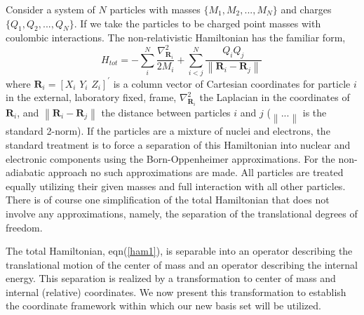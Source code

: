 \documentclass[12pt,doublespace]{article}
\begin{document}
Consider a system of $N$ particles with masses $\{M_{1},M_{2},...,M_{N}\}$
and charges $\{Q_{1},Q_{2},...,Q_{N}\}$. If we take the particles to be
charged point masses with coulombic interactions. The non-relativistic
Hamiltonian has the familiar form, 
\begin{equation}
H_{tot}=-\sum_{i}^{N}\frac{\nabla _{\mathbf{R}_{i}}^{2}}{2M_{i}}%
+\sum_{i<j}^{N}\frac{Q_{i}Q_{j}}{\left\| \mathbf{R}_{i}-\mathbf{R}%
_{j}\right\| }\,  \label{ham1}
\end{equation}
where $\mathbf{R}_{i}=[X_{i}\,\,Y_{i}\,\,Z_{i}]^{\prime }$ is a column
vector of Cartesian coordinates for particle $i$ in the external, laboratory
fixed, frame, $\nabla _{\mathbf{R}_{i}}^{2}$ the Laplacian in the
coordinates of $\mathbf{R}_{i}$, and $\left\| \mathbf{R}_{i}-\mathbf{R}%
_{j}\right\| $ the distance between particles $i$ and $j$ ($\left\|
...\right\| $ is the standard 2-norm). If the particles are a mixture of
nuclei and electrons, the standard treatment is to force a separation of
this Hamiltonian into nuclear and electronic components using the
Born-Oppenheimer approximations. For the non-adiabatic approach no such
approximations are made. All particles are treated equally utilizing their
given masses and full interaction with all other particles. There is of
course one simplification of the total Hamiltonian that does not involve any
approximations, namely, the separation of the translational degrees of
freedom.

The total Hamiltonian, eqn(\ref{ham1}), is separable into an operator
describing the translational motion of the center of mass and an operator
describing the internal energy. This separation is realized by a
transformation to center of mass and internal (relative) coordinates. We now
present this transformation to establish the coordinate framework within
which our new basis set will be utilized.
\end{document}
